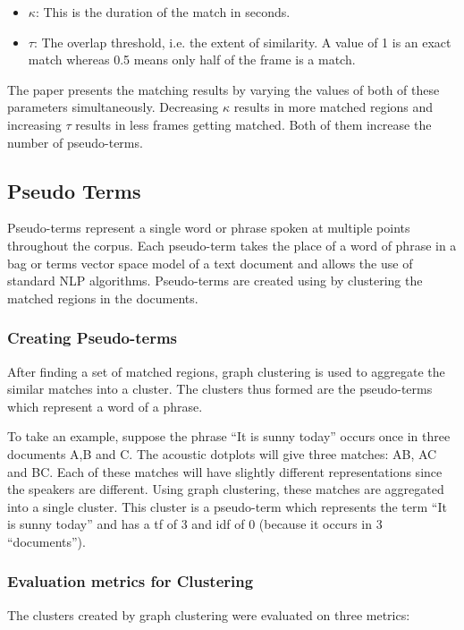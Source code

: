 \documentclass[a4paper]{article}
\begin{document}
\begin{itemize}
\item $\kappa$: This is the duration of the match in seconds.
\item $\tau$: The overlap threshold, i.e. the extent of similarity. A value of 1 is an exact match whereas 0.5 means only half of the frame is a match.
\end{itemize}

The paper presents the matching results by varying the values of both of these parameters simultaneously. Decreasing $\kappa$ results in more matched regions and increasing $\tau$ results in less frames getting matched. Both of them increase the number of pseudo-terms.

\subsection{Pseudo Terms}
Pseudo-terms represent a single word or phrase spoken at multiple points throughout the corpus. Each pseudo-term takes the place of a word of phrase in a bag or terms vector space model of a text document and allows the use of standard NLP algorithms. Pseudo-terms are created using by clustering the matched regions in the documents.

\subsubsection{Creating Pseudo-terms}
After finding a set of matched regions, graph clustering is used to aggregate the similar matches into a cluster.
The clusters thus formed are the pseudo-terms which represent a word of a phrase.

To take an example, suppose the phrase “It is sunny today” occurs once in three documents A,B and C. The acoustic dotplots will give three matches: AB, AC and BC. Each of these matches will have slightly different representations since the speakers are different. Using graph clustering, these matches are aggregated into a single cluster. This cluster is a pseudo-term which represents the term “It is sunny today” and has a tf of 3 and idf of 0 (because it occurs in 3 “documents”).

\subsubsection{Evaluation metrics for Clustering}
The clusters created by graph clustering were evaluated on three metrics:
\end{document}
